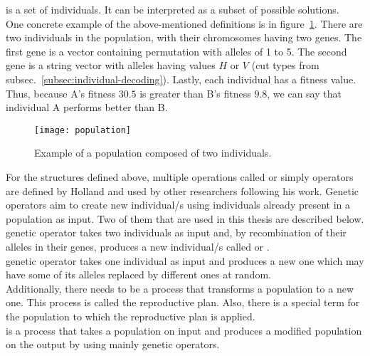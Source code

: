  is a set of individuals.
It can be interpreted as a subset of possible solutions.\\

One concrete example of the above-mentioned definitions is in figure~\ref{fig:population}.
There are two individuals in the population, with their chromosomes having two genes.
The first gene is a vector containing permutation with alleles of 1 to 5.
The second gene is a string vector
with alleles having values $H$ or $V$ (cut types from subsec.~\ref{subsec:individual-decoding}).
Lastly, each individual has a fitness value.
Thus, because A’s fitness $30.5$ is greater than B’s fitness $9.8$, we can say that individual A performs better than B.


\begin{figure}
    \texttt{[image: population]}
    \caption[Population example]{Example of a population composed of two individuals.}
    \label{fig:population}
\end{figure}

For the structures defined above, multiple operations called  or simply operators
are defined by Holland and used by other researchers following his work.
Genetic operators aim to create new individual/s using individuals already present in a population as input.
Two of them that are used in this thesis are described below.\\


 genetic operator takes two individuals as input and, by recombination
of their alleles in their genes, produces a new individual/s called  or .\\

 genetic operator takes one individual as input and produces a new one
which may have some of its alleles replaced by different ones at random.\\

Additionally, there needs to be a process that transforms a population
to a new one.
This process is called the reproductive plan.
Also, there is a special term for the population to which the reproductive plan is applied.
\\

 is a process that takes a population on input and produces a modified population on the output
by using mainly genetic operators.\\

